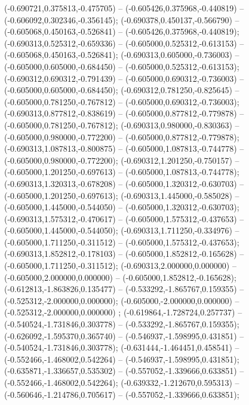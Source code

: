  (-0.690721,0.375813,-0.475705) -- (-0.605426,0.375968,-0.440819) -- (-0.606092,0.302346,-0.356145);
 (-0.690378,0.450137,-0.566790) -- (-0.605068,0.450163,-0.526841) -- (-0.605426,0.375968,-0.440819);
 (-0.690313,0.525312,-0.659336) -- (-0.605000,0.525312,-0.613153) -- (-0.605068,0.450163,-0.526841);
 (-0.690313,0.605000,-0.736003) -- (-0.605000,0.605000,-0.684450) -- (-0.605000,0.525312,-0.613153);
 (-0.690312,0.690312,-0.791439) -- (-0.605000,0.690312,-0.736003) -- (-0.605000,0.605000,-0.684450);
 (-0.690312,0.781250,-0.825645) -- (-0.605000,0.781250,-0.767812) -- (-0.605000,0.690312,-0.736003);
 (-0.690313,0.877812,-0.838619) -- (-0.605000,0.877812,-0.779878) -- (-0.605000,0.781250,-0.767812);
 (-0.690313,0.980000,-0.830363) -- (-0.605000,0.980000,-0.772200) -- (-0.605000,0.877812,-0.779878);
 (-0.690313,1.087813,-0.800875) -- (-0.605000,1.087813,-0.744778) -- (-0.605000,0.980000,-0.772200);
 (-0.690312,1.201250,-0.750157) -- (-0.605000,1.201250,-0.697613) -- (-0.605000,1.087813,-0.744778);
 (-0.690313,1.320313,-0.678208) -- (-0.605000,1.320312,-0.630703) -- (-0.605000,1.201250,-0.697613);
 (-0.690313,1.445000,-0.585028) -- (-0.605000,1.445000,-0.544050) -- (-0.605000,1.320312,-0.630703);
 (-0.690313,1.575312,-0.470617) -- (-0.605000,1.575312,-0.437653) -- (-0.605000,1.445000,-0.544050);
 (-0.690313,1.711250,-0.334976) -- (-0.605000,1.711250,-0.311512) -- (-0.605000,1.575312,-0.437653);
 (-0.690313,1.852812,-0.178103) -- (-0.605000,1.852812,-0.165628) -- (-0.605000,1.711250,-0.311512);
 (-0.690313,2.000000,0.000000) -- (-0.605000,2.000000,0.000000) -- (-0.605000,1.852812,-0.165628);
 (-0.612813,-1.863826,0.135477) -- (-0.533292,-1.865767,0.159355) -- (-0.525312,-2.000000,0.000000);
 (-0.605000,-2.000000,0.000000) -- (-0.525312,-2.000000,0.000000) ;
 (-0.619864,-1.728724,0.257737) -- (-0.540524,-1.731846,0.303778) -- (-0.533292,-1.865767,0.159355);
 (-0.626092,-1.595370,0.365740) -- (-0.546937,-1.598995,0.431851) -- (-0.540524,-1.731846,0.303778);
 (-0.631444,-1.464451,0.458541) -- (-0.552466,-1.468002,0.542264) -- (-0.546937,-1.598995,0.431851);
 (-0.635871,-1.336657,0.535302) -- (-0.557052,-1.339666,0.633851) -- (-0.552466,-1.468002,0.542264);
 (-0.639332,-1.212670,0.595313) -- (-0.560646,-1.214786,0.705617) -- (-0.557052,-1.339666,0.633851);
